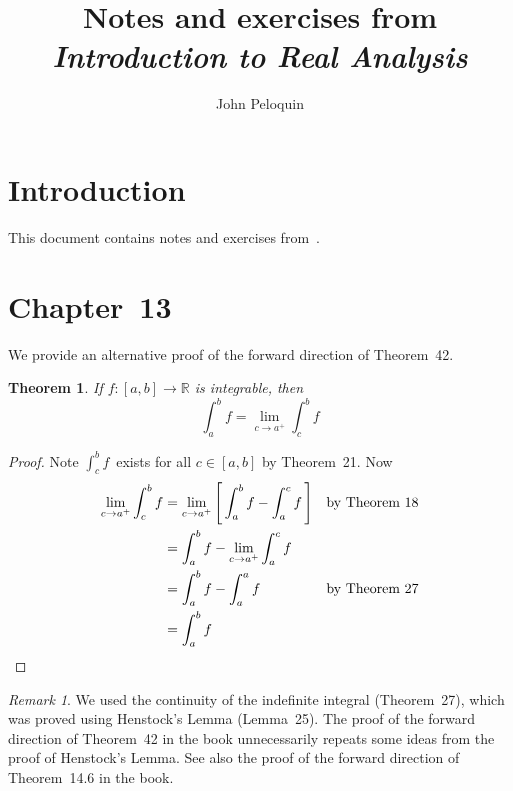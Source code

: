 \documentclass[letterpaper,12pt]{article}
\title{Notes and exercises from\\\textit{Introduction to Real Analysis}}
\author{John Peloquin}
\date{}
\newcommand{\R}{\mathbb{R}}
\theoremstyle{plain}
\newtheorem*{thm}{Theorem}
\theoremstyle{definition}
\theoremstyle{remark}
\newtheorem*{rmk}{Remark}
\begin{document}
\maketitle

\section*{Introduction}
This document contains notes and exercises from~\cite{depree}.

\section*{Chapter~13}
We provide an alternative proof of the forward direction of Theorem~42.
\begin{thm} If \(f:[a,b]\to\R\) is integrable, then
\[\int_a^b f=\lim_{c\to a^+}\int_c^b f\]
\end{thm}
\begin{proof}
Note \(\int_c^b f\)~exists for all \(c\in[a,b]\) by Theorem~21. Now
\begin{align*}
\lim_{c\to a^+}\int_c^b f&=\lim_{c\to a^+}\left[\,\int_a^b f-\int_a^c f\,\right]&&\text{by Theorem~18}\\
	&=\int_a^b f-\lim_{c\to a^+}\int_a^c f&&\\
	&=\int_a^b f-\int_a^a f&&\text{by Theorem~27}\\
	&=\int_a^b f&&\qedhere
\end{align*}
\end{proof}
\begin{rmk}
We used the continuity of the indefinite integral (Theorem~27), which was proved using Henstock's Lemma (Lemma~25). The proof of the forward direction of Theorem~42 in the book unnecessarily repeats some ideas from the proof of Henstock's Lemma. See also the proof of the forward direction of Theorem~14.6 in the book.
\end{rmk}
\end{document}
